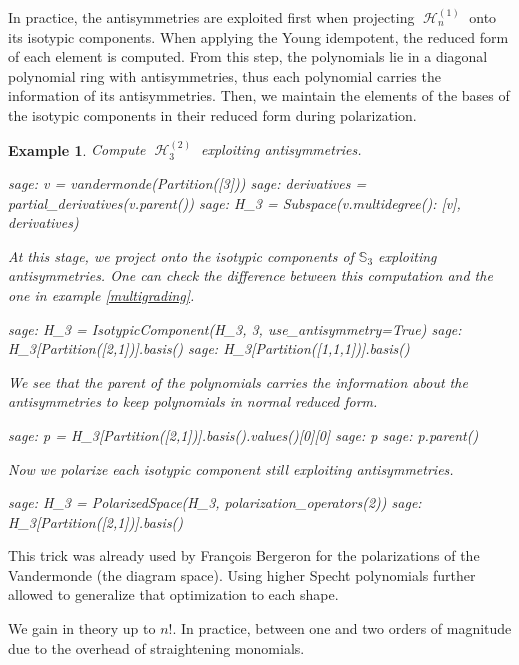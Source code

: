 \documentclass[letter,12pt]{article}
\newcommand{\Sym}[1]{\mathbb{S}_{#1}}
\DeclareMathOperator{\harmonics}{\mathcal{H}}
\newtheorem{example}{Example}
\begin{document}
	In practice, the antisymmetries are exploited first when projecting $\harmonics_n^{(1)}$ onto its isotypic components. When applying the Young idempotent, the reduced form of each element is computed. From this step, the polynomials lie in a diagonal polynomial ring with antisymmetries, thus each polynomial carries the information of its antisymmetries.  
	Then, we maintain the elements of the bases of the isotypic components in their reduced form during polarization. 

	\begin{example}
			Compute $\harmonics_3^{(2)}$ exploiting antisymmetries. 
		\begin{sagecommandline}
			sage: v = vandermonde(Partition([3]))
			sage: derivatives = partial_derivatives(v.parent())
			sage: H_3 = Subspace({v.multidegree(): [v]}, derivatives)
		\end{sagecommandline}
		At this stage, we project onto the isotypic components of $\Sym{3}$ exploiting antisymmetries. One can check the difference between this computation and the one in example \ref{multigrading}. 
		\begin{sagecommandline}
			sage: H_3 = IsotypicComponent(H_3, 3, use_antisymmetry=True)
			sage: H_3[Partition([2,1])].basis()
			sage: H_3[Partition([1,1,1])].basis()
		\end{sagecommandline}
		We see that the parent of the polynomials carries the information about the antisymmetries to keep polynomials in normal reduced form.
		\begin{sagecommandline}
			sage: p = H_3[Partition([2,1])].basis().values()[0][0]
			sage: p
			sage: p.parent()
		\end{sagecommandline}
		Now we polarize each isotypic component still exploiting antisymmetries.  
		\begin{sagecommandline}
			sage: H_3 = PolarizedSpace(H_3, polarization_operators(2))
			sage: H_3[Partition([2,1])].basis()
		\end{sagecommandline}
	\end{example}
	
	This trick was already used by François Bergeron for the polarizations of the Vandermonde (the diagram space). Using higher Specht polynomials further allowed  to generalize that optimization to each shape.
	
	We gain in theory up to $n!$. In practice, between one and two orders of magnitude due to the overhead of straightening monomials.
	
\end{document}

